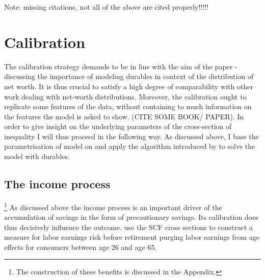 \documentclass[a4paper,12pt]{article}
\begin{document}
Note: missing citations, not all of the above are cited properly!!!!!


\section{Calibration}
The calibration strategy demands to be in line with the aim of the paper - discussing the importance of modeling durables in context of the distribution of net worth. It is thus crucial to satisfy a high degree of comparability with other work dealing with net-worth distributions. Moreover, the calibration ought to replicate some features of the data, without containing to much information on the features the model is asked to show. (CITE SOME BOOK/ PAPER). 
In order to give insight on the underlying parameters of the cross-section of inequality I will thus proceed in the following way. As discussed above, I base the parametrisation of model on \cite{hintermaier2011} and apply the algorithm introduced by \cite{hintermaier2010} to solve the model with durables. 

\subsection{The income process}
\footnote{The construction of these benefits is discussed in the Appendix.}
As discussed above the income process is an important driver of the accumulation of savings in the form of precautionary savings. Its calibration does thus decisively influence the outcome. 
\cite{hintermaier2011} use the SCF cross sections to construct a measure for labor earnings risk before retirement purging labor earnings from age effects for consumers between age 26 and age 65. 
\end{document}
